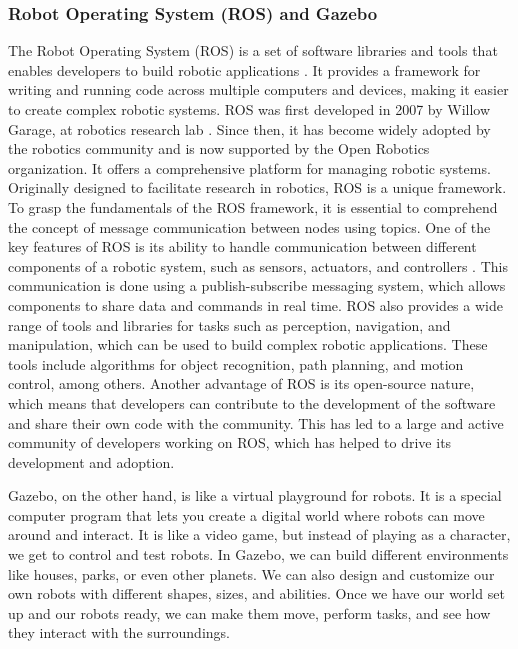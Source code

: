 \documentclass[12pt,oneside]{article}
\begin{document}
\subsubsection{Robot Operating System (ROS) and Gazebo}
The Robot Operating System (ROS) is a set of software libraries and tools that enables developers to build robotic applications \cite{15_quigley2009ros}. It provides a framework for writing and running code across multiple computers and devices, making it easier to create complex robotic systems. ROS was first developed in 2007 by Willow Garage, at robotics research lab \cite{16_cousins2014willow}. Since then, it has become widely adopted by the robotics community and is now supported by the Open Robotics organization. It offers a comprehensive platform for managing robotic systems. Originally designed to facilitate research in robotics, ROS is a unique framework. To grasp the fundamentals of the ROS framework, it is essential to comprehend the concept of message communication between nodes using topics.
One of the key features of ROS is its ability to handle communication between different components of a robotic system, such as sensors, actuators, and controllers \cite{17_emmi2014new}. This communication is done using a publish-subscribe messaging system, which allows components to share data and commands in real time. ROS also provides a wide range of tools and libraries for tasks such as perception, navigation, and manipulation, which can be used to build complex robotic applications. These tools include algorithms for object recognition, path planning, and motion control, among others. Another advantage of ROS is its open-source nature, which means that developers can contribute to the development of the software and share their own code with the community. This has led to a large and active community of developers working on ROS, which has helped to drive its development and adoption.

Gazebo, on the other hand, is like a virtual playground for robots. It is a special computer program that lets you create a digital world where robots can move around and interact. It is like a video game, but instead of playing as a character, we get to control and test robots.
In Gazebo, we can build different environments like houses, parks, or even other planets. We can also design and customize our own robots with different shapes, sizes, and abilities. Once we have our world set up and our robots ready, we can make them move, perform tasks, and see how they interact with the surroundings.
\end{document}
